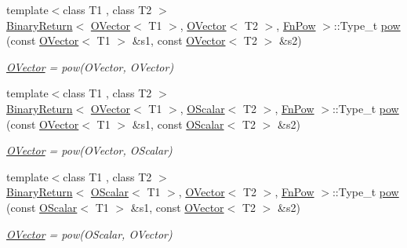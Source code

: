 \begin{DoxyCompactItemize}
\item 
{\footnotesize template$<$class T1 , class T2 $>$ }\\\mbox{\hyperlink{structENSEM_1_1BinaryReturn}{Binary\+Return}}$<$ \mbox{\hyperlink{classENSEM_1_1OVector}{O\+Vector}}$<$ T1 $>$, \mbox{\hyperlink{classENSEM_1_1OVector}{O\+Vector}}$<$ T2 $>$, \mbox{\hyperlink{structENSEM_1_1FnPow}{Fn\+Pow}} $>$\+::Type\+\_\+t \mbox{\hyperlink{group__obsvector_ga48ab93692ad432295c8498d12a368861}{pow}} (const \mbox{\hyperlink{classENSEM_1_1OVector}{O\+Vector}}$<$ T1 $>$ \&s1, const \mbox{\hyperlink{classENSEM_1_1OVector}{O\+Vector}}$<$ T2 $>$ \&s2)
\begin{DoxyCompactList}\small\item\em \mbox{\hyperlink{classENSEM_1_1OVector}{O\+Vector}} = pow(\+O\+Vector, O\+Vector) \end{DoxyCompactList}\item 
{\footnotesize template$<$class T1 , class T2 $>$ }\\\mbox{\hyperlink{structENSEM_1_1BinaryReturn}{Binary\+Return}}$<$ \mbox{\hyperlink{classENSEM_1_1OVector}{O\+Vector}}$<$ T1 $>$, \mbox{\hyperlink{classENSEM_1_1OScalar}{O\+Scalar}}$<$ T2 $>$, \mbox{\hyperlink{structENSEM_1_1FnPow}{Fn\+Pow}} $>$\+::Type\+\_\+t \mbox{\hyperlink{group__obsvector_gacd9051c476ef11d6697002aa2b6ecd7c}{pow}} (const \mbox{\hyperlink{classENSEM_1_1OVector}{O\+Vector}}$<$ T1 $>$ \&s1, const \mbox{\hyperlink{classENSEM_1_1OScalar}{O\+Scalar}}$<$ T2 $>$ \&s2)
\begin{DoxyCompactList}\small\item\em \mbox{\hyperlink{classENSEM_1_1OVector}{O\+Vector}} = pow(\+O\+Vector, O\+Scalar) \end{DoxyCompactList}\item 
{\footnotesize template$<$class T1 , class T2 $>$ }\\\mbox{\hyperlink{structENSEM_1_1BinaryReturn}{Binary\+Return}}$<$ \mbox{\hyperlink{classENSEM_1_1OScalar}{O\+Scalar}}$<$ T1 $>$, \mbox{\hyperlink{classENSEM_1_1OVector}{O\+Vector}}$<$ T2 $>$, \mbox{\hyperlink{structENSEM_1_1FnPow}{Fn\+Pow}} $>$\+::Type\+\_\+t \mbox{\hyperlink{group__obsvector_ga3466dc3452f93c110d8adba91bf1e85a}{pow}} (const \mbox{\hyperlink{classENSEM_1_1OScalar}{O\+Scalar}}$<$ T1 $>$ \&s1, const \mbox{\hyperlink{classENSEM_1_1OVector}{O\+Vector}}$<$ T2 $>$ \&s2)
\begin{DoxyCompactList}\small\item\em \mbox{\hyperlink{classENSEM_1_1OVector}{O\+Vector}} = pow(\+O\+Scalar, O\+Vector) \end{DoxyCompactList}\item 

\end{DoxyCompactItemize}
